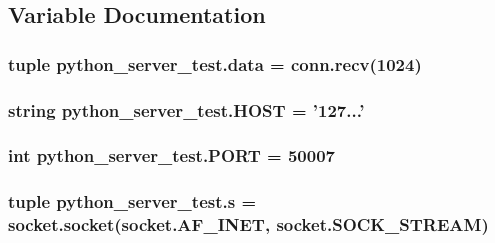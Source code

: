 \subsection{Variable Documentation}
\hypertarget{namespacepython__server__test_a90f9b90774f5dfbde525eb537d21b4d9}{
\subsubsection[{data}]{\setlength{\rightskip}{0pt plus 5cm}tuple python\-\_\-server\-\_\-test.\-data = conn.\-recv(1024)}}\label{namespacepython__server__test_a90f9b90774f5dfbde525eb537d21b4d9}
\hypertarget{namespacepython__server__test_ad58043a7b7b230922688efa34ba27360}{
\subsubsection[{H\-O\-S\-T}]{\setlength{\rightskip}{0pt plus 5cm}string python\-\_\-server\-\_\-test.\-H\-O\-S\-T = '127...'}}\label{namespacepython__server__test_ad58043a7b7b230922688efa34ba27360}
\hypertarget{namespacepython__server__test_aef25402ff217d52e13595e15db533362}{
\subsubsection[{P\-O\-R\-T}]{\setlength{\rightskip}{0pt plus 5cm}int python\-\_\-server\-\_\-test.\-P\-O\-R\-T = 50007}}\label{namespacepython__server__test_aef25402ff217d52e13595e15db533362}
\hypertarget{namespacepython__server__test_a6caadb6ba3499c7bb77e87e70033cb6e}{
\subsubsection[{s}]{\setlength{\rightskip}{0pt plus 5cm}tuple python\-\_\-server\-\_\-test.\-s = socket.\-socket(socket.\-A\-F\-\_\-\-I\-N\-E\-T, socket.\-S\-O\-C\-K\-\_\-\-S\-T\-R\-E\-A\-M)}}\label{namespacepython__server__test_a6caadb6ba3499c7bb77e87e70033cb6e}
